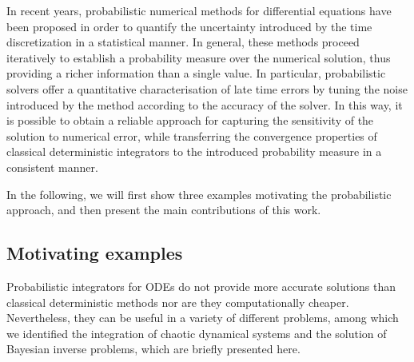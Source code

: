 \documentclass[10pt]{article}
\begin{document}
In recent years, probabilistic numerical methods for differential equations have been proposed \cite{CGS17, CCC16, SDH14} in order to quantify the uncertainty introduced by the time discretization in a statistical manner.  In general, these methods proceed iteratively to establish a probability measure over the numerical solution, thus providing a richer information than a single  value. In particular, probabilistic solvers offer a quantitative characterisation of late time errors by tuning the noise introduced by the method according to the accuracy of the solver. In this way, it is possible to obtain a reliable approach for capturing the sensitivity of the solution to numerical error, while transferring the convergence properties of classical deterministic integrators to the introduced probability measure in a consistent manner. 

In the following, we will first show three examples motivating the probabilistic approach, and then present the main contributions of this work.

\subsection{Motivating examples} Probabilistic integrators for ODEs do not provide more accurate solutions than classical deterministic methods nor are they computationally cheaper. Nevertheless, they can be useful in a variety of different problems, among which we identified the integration of chaotic dynamical systems and the solution of Bayesian inverse problems, which are briefly presented here.
\end{document}
